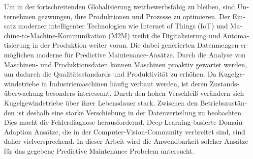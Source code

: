 \begin{otherlanguage}{ngerman} %
Um in der fortschreitenden Globalisierung wettbewerbsfähig zu bleiben, sind Unternehmen gezwungen, ihre Produktionen und Prozesse zu optimieren. Der Einsatz moderner intelligenter Technologien wie Internet of Things (IoT) und Machine-to-Machine-Kommunikation (M2M) treibt die Digitalisierung und Automatisierung in der Produktion weiter voran. Die dabei generierten Datenmengen ermöglichen moderne für Predictive Maintenance-Ansätze. Durch die Analyse von Maschinen- und Produktionsdaten können Maschinen proaktiv gewartet werden, um dadurch die Qualitätsstandards und Produktivität zu erhöhen. Da Kugelgewindetriebe  in Industriemaschinen häufig verbaut werden, ist deren Zustandsüberwachung besonders interessant. Durch den hohen Verschleiß verändern sich Kugelgewindetriebe über ihrer Lebensdauer stark. Zwischen den Betriebszuständen ist deshalb eine starke Verschiebung in der Datenverteilung zu beobachten. Dies macht die Fehlerdiagnose herausfordernd. Deep-Learning-basierte Domain-Adaption Ansätze, die in der Computer-Vision-Community verbreitet sind, sind daher vielversprechend. In dieser Arbeit wird die Anwendbarkeit solcher Ansätze für das gegebene Predictive Maintenance Probelem untersucht. 


\end{otherlanguage}


\makeatletter
{}
{\renewcommand{\abstractname}{Abstract}}
{\renewcommand{\abstractname}{Kurzfassung}}
\makeatother